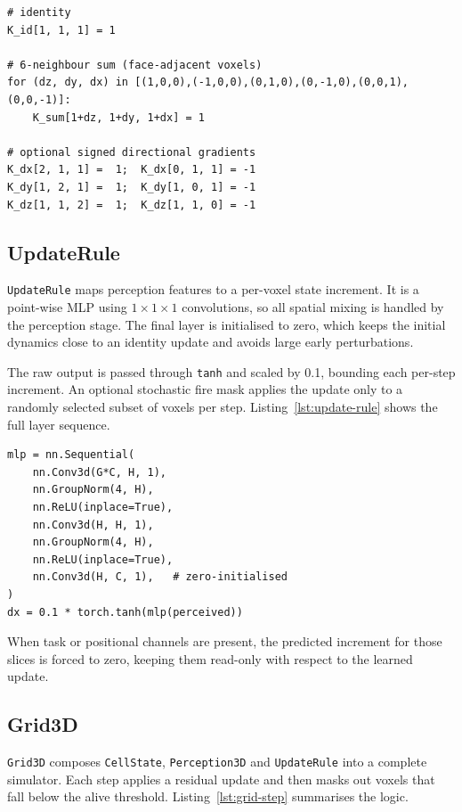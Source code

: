 \begin{lstlisting}[style=py, caption={Perception kernels applied per input
channel (conceptual form).}, label={lst:perception-kernels}]
# identity
K_id[1, 1, 1] = 1

# 6-neighbour sum (face-adjacent voxels)
for (dz, dy, dx) in [(1,0,0),(-1,0,0),(0,1,0),(0,-1,0),(0,0,1),(0,0,-1)]:
    K_sum[1+dz, 1+dy, 1+dx] = 1

# optional signed directional gradients
K_dx[2, 1, 1] =  1;  K_dx[0, 1, 1] = -1
K_dy[1, 2, 1] =  1;  K_dy[1, 0, 1] = -1
K_dz[1, 1, 2] =  1;  K_dz[1, 1, 0] = -1
\end{lstlisting}

\subsection{UpdateRule}

\texttt{UpdateRule} maps perception features to a per-voxel state increment.
It is a point-wise MLP using $1{\times}1{\times}1$ convolutions, so all
spatial mixing is handled by the perception stage. The final layer is
initialised to zero, which keeps the initial dynamics close to an identity
update and avoids large early perturbations.

The raw output is passed through \texttt{tanh} and scaled by 0.1, bounding
each per-step increment. An optional stochastic fire mask applies the update
only to a randomly selected subset of voxels per step. Listing~\ref{lst:update-rule}
shows the full layer sequence.

\begin{lstlisting}[style=py, caption={Update rule MLP implemented with
$1{\times}1{\times}1$ convolutions.}, label={lst:update-rule}]
mlp = nn.Sequential(
    nn.Conv3d(G*C, H, 1),
    nn.GroupNorm(4, H),
    nn.ReLU(inplace=True),
    nn.Conv3d(H, H, 1),
    nn.GroupNorm(4, H),
    nn.ReLU(inplace=True),
    nn.Conv3d(H, C, 1),   # zero-initialised
)
dx = 0.1 * torch.tanh(mlp(perceived))
\end{lstlisting}

When task or positional channels are present, the predicted increment for
those slices is forced to zero, keeping them read-only with respect to the
learned update.

\subsection{Grid3D}

\texttt{Grid3D} composes \texttt{CellState}, \texttt{Perception3D} and
\texttt{UpdateRule} into a complete simulator. Each step applies a residual
update and then masks out voxels that fall below the alive threshold.
Listing~\ref{lst:grid-step} summarises the logic.

